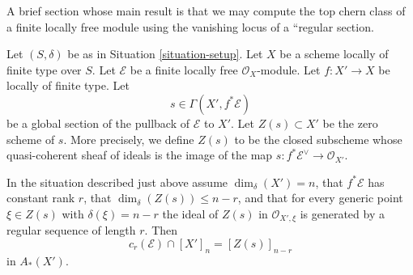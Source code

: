 \noindent
A brief section whose main result is that we may compute the
top chern class of a finite locally free module using the
vanishing locus of a ``regular section.

\medskip\noindent
Let $(S, \delta)$ be as in Situation \ref{situation-setup}. Let $X$ be a scheme
locally of finite type over $S$. Let $\mathcal{E}$ be a finite locally
free $\mathcal{O}_X$-module. Let $f : X' \to X$ be locally of finite type. Let
$$
s \in \Gamma(X', f^*\mathcal{E})
$$
be a global section of the pullback of $\mathcal{E}$ to $X'$. Let
$Z(s) \subset X'$ be the zero scheme of $s$. More precisely, we define
$Z(s)$ to be the closed subscheme whose quasi-coherent sheaf
of ideals is the image of the map
$s : f^*\mathcal{E}^\vee \to \mathcal{O}_{X'}$.

\begin{lemma}
\label{lemma-top-chern-class}
In the situation described just above assume $\dim_\delta(X') = n$,
that $f^*\mathcal{E}$ has constant rank $r$, that
$\dim_\delta(Z(s)) \leq n - r$, and that for every generic point
$\xi \in Z(s)$ with $\delta(\xi) = n - r$ the ideal of $Z(s)$
in $\mathcal{O}_{X', \xi}$ is generated by a regular sequence
of length $r$. Then
$$
c_r(\mathcal{E}) \cap [X']_n = [Z(s)]_{n - r}
$$
in $A_*(X')$.
\end{lemma}

